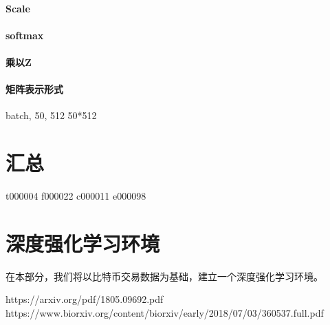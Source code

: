 \documentclass{article}
\begin{document}
    











\paragraph{Scale}

\paragraph{softmax}
\paragraph{乘以Z}
\paragraph{矩阵表示形式}



batch, 50, 512 50*512

\section{汇总}
t000004
f000022
c000011
e000098

\section{深度强化学习环境}
在本部分，我们将以比特币交易数据为基础，建立一个深度强化学习环境。

https://arxiv.org/pdf/1805.09692.pdf
https://www.biorxiv.org/content/biorxiv/early/2018/07/03/360537.full.pdf





\newpage




\appendix
\end{document}
